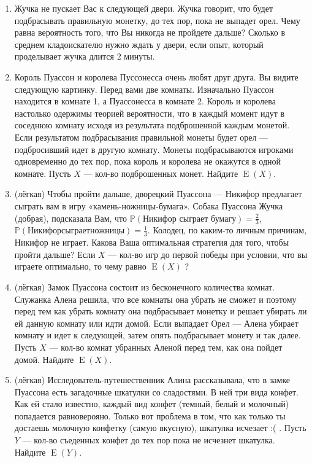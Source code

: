 \documentclass[a4paper,12pt]{article}
\DeclareMathOperator{\E}{E}
\def \P{\mathbb{P}}
\begin{document}
\begin{enumerate} %
\item Жучка не пускает Вас к следующей двери. Жучка говорит, что будет подбрасывать правильную монетку, до тех пор, пока не выпадет орел. Чему равна вероятность того, что Вы никогда не пройдете дальше? Сколько в среднем кладоискателю нужно ждать у двери, если опыт, который проделывает жучка длится 2 минуты.
\item Король Пуассон и королева Пуссонесса очень любят друг друга. Вы видите следующую картинку. Перед вами две комнаты. Изначально Пуассон находится в комнате 1, а Пуассонесса в комнате 2. Король и королева настолько одержимы теорией вероятности, что в каждый момент идут в соседнюю комнату исходя из результата подброшенной каждым монетой. Если результатом подбрасывания правильной монеты будет орел — подбросивший идет в другую комнату. Монеты подбрасываются игроками одновременно до тех пор, пока король и королева не окажутся в одной комнате.
Пусть $X$ — кол-во подброшенных монет. Найдите $\E(X)$.
\item (лёгкая) Чтобы пройти дальше, дворецкий Пуассона — Никифор предлагает сыграть вам в игру «камень-ножницы-бумага». Собака Пуассона Жучка (добрая), подсказала Вам, что $\P(\text{Никифор сыграет бумагу}) = \frac{2}{3}$, $\P({Никифор сыграет ножницы}) = \frac{1}{3}$. Колодец, по каким-то личным причинам, Никифор не играет. Какова Ваша оптимальная стратегия для того, чтобы пройти дальше? Если $X$ — кол-во игр до первой победы при условии, что вы играете оптимально, то чему равно $\E(X)$ ?
\item (лёгкая) Замок Пуассона состоит из бесконечного количества комнат. Служанка Алена решила, что все комнаты она убрать не сможет и поэтому перед тем как убрать комнату она подбрасывает монетку и решает убирать ли ей данную комнату или идти домой. Если выпадает Орел — Алена убирает комнату и идет к следующей, затем опять подбрасывает монету и так далее. Пусть $X$ — кол-во комнат убранных Аленой перед тем, как она пойдет домой. Найдите $\E(X)$.
\item (лёгкая) Исследователь-путешественник Алина рассказывала, что в замке Пуассона есть загадочные шкатулки со сладостями. В ней три вида конфет. Как ей стало известно, каждый вид конфет (темный, белый и молочный) попадается равноверояно. Только вот проблема в том, что как только ты достаешь молочную конфетку (самую вкусную), шкатулка исчезает :( .
Пусть $Y$ — кол-во съеденных конфет до тех пор пока не исчезнет шкатулка. Найдите $\E(Y)$.
\end{enumerate}
\end{document}
